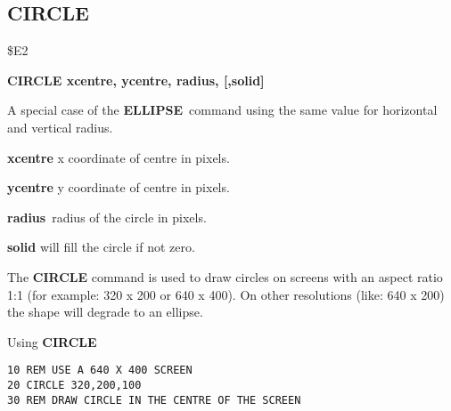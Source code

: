 \subsection{CIRCLE}
\begin{description}[leftmargin=2cm,style=nextline]
\item [Token:] \$E2
\item [Format:] {\bf CIRCLE xcentre, ycentre, radius, [,solid]}
\item [Usage:] A special case of
               the {\bf ELLIPSE} command using the same value for
               horizontal and vertical radius.

               {\bf xcentre} x coordinate of centre in pixels.

               {\bf ycentre} y coordinate of centre in pixels.

               {\bf radius} radius of the circle in pixels.

               {\bf solid} will fill the circle if not zero.

\item [Remarks:] The {\bf CIRCLE} command is used to draw circles on
               screens with an aspect ratio 1:1 (for example: 320 x 200
               or 640 x 400). On other resolutions (like: 640 x 200)
               the shape will degrade to an ellipse.

\item [Example:] Using {\bf CIRCLE}
\begin{tcolorbox}[colback=black,coltext=white]
\verbatimfont{\codefont}
\begin{verbatim}
10 REM USE A 640 X 400 SCREEN
20 CIRCLE 320,200,100
30 REM DRAW CIRCLE IN THE CENTRE OF THE SCREEN
\end{verbatim}
\end{tcolorbox}
\end{description}


\newpage
